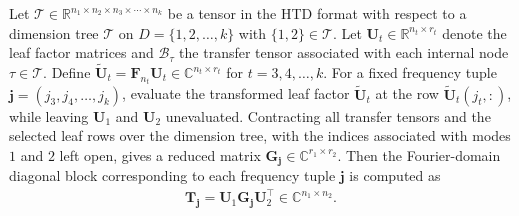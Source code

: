 \documentclass[onefignum,onetabnum]{siamart250211}
\begin{document}


\begin{proposition}
\label{thm:htd_kth_block_diag}
Let $\mathscr{T}\in\mathbb{R}^{n_1\times n_2\times n_3\times\cdots\times n_k}$
be a tensor in the HTD format with respect to a dimension tree $\mathcal{T}$ on
$D=\{1,2, \dots,k\}$ with $\{1,2\}\in\mathcal{T}$. Let
$\textbf{U}_t\in\mathbb{R}^{n_t\times r_t}$ denote the leaf factor matrices and
 $\mathscr{B}_\tau$  the transfer tensor associated with each internal
node $\tau\in\mathcal{T}$. Define $\widetilde{\textbf{U}}_t
=
\textbf{F}_{n_t}\textbf{U}_t
\in
\mathbb{C}^{n_t\times r_t}$ for $t=3, 4, \dots,k$.
For a fixed frequency tuple
$\boldsymbol{j}=(j_3,j_4, \dots,j_k)$, evaluate the transformed leaf
factor $\widetilde{\textbf{U}}_t$ at the row
$\widetilde{\textbf{U}}_t(j_t,:)$, while leaving
$\textbf{U}_1$ and $\textbf{U}_2$ unevaluated. Contracting all transfer tensors
and the selected leaf rows over the dimension tree, with the indices associated
with modes $1$ and $2$ left open, gives a reduced matrix $\textbf{G}_{\boldsymbol{j}}
\in
\mathbb{C}^{r_1\times r_2}.$ 
Then the Fourier-domain diagonal block corresponding to each frequency tuple $\boldsymbol{j}$ is computed as
\begin{align*}
\textbf{T}_{\boldsymbol{j}}
=
\textbf{U}_1
\textbf{G}_{\boldsymbol{j}}
\textbf{U}_2^{\top}
\in
\mathbb{C}^{n_1\times n_2}.
\end{align*}
\end{proposition}
\end{document}
